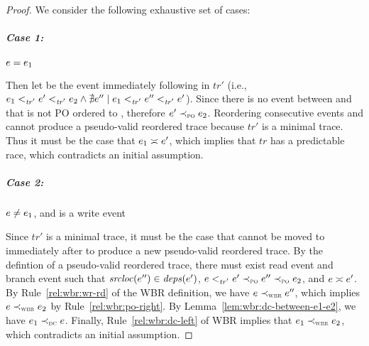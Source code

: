 \documentclass[letter,10pt]{article}
\newcommand{\conflicts}[2]{\ensuremath{#1 \asymp #2}} %
\newcommand{\getStatic}[1]{\ensuremath{\mathit{srcloc}(#1)}\xspace}
\newcommand{\getDeps}[1]{\ensuremath{\mathit{deps}(#1)}\xspace}
\newcommand{\tr}{\ensuremath{\mathit{tr}}\xspace}
\newcommand{\trPrime}{\ensuremath{\mathit{tr'}}\xspace}
\newcommand{\PO}{PO\xspace}
\newcommand{\WDC}{DC\xspace}
\newcommand{\BR}{BR\xspace}
\newcommand{\WBR}{W\BR}
\newcommand{\DCOrdered}[2]{\WDCOrdered{#1}{#2}}
\newcommand{\ltTRPrime}{\ensuremath{<_\textsc{\trPrime}}\xspace}
\newcommand{\ltPO}{\ensuremath{\prec_\textsc{\tiny{\PO}}}\xspace}
\newcommand{\ltWDC}{\ensuremath{\prec_\textsc{\tiny{\WDC}}}\xspace}
\newcommand{\ltWBR}{\ensuremath{\prec_\textsc{\tiny{\WBR}}}\xspace}
\newcommand{\Ordered}[3]{\ensuremath{#1 #2 #3}}
\newcommand{\TRPrimeOrdered}[2]{\Ordered{#1}{\ltTRPrime}{#2}}
\newcommand{\POOrdered}[2]{\Ordered{#1}{\ltPO}{#2}}
\newcommand{\WDCOrdered}[2]{\Ordered{#1}{\ltWDC}{#2}}
\newcommand{\WBROrdered}[2]{\Ordered{#1}{\ltWBR}{#2}}
\newcommand\BrDepsOn[2]{\ensuremath{\getStatic{#2} \in \getDeps{#1}}}
\newcommand{\originalgrumbler}[2]{\begin{quote}\textcolor{blue}{\sl{\bf #1 says:} #2}\end{quote}}
\newcommand{\grumbler}[2]{\originalgrumbler{#1}{#2}}
\newcommand{\mike}[1]{\grumbler{Mike}{#1}}
\newcommand{\kaan}[1]{\grumbler{Kaan}{#1}}
\begin{document}
\begin{proof}
We consider the following exhaustive set of cases:

\subparagraph{Case 1:}
$\event{e} = \event{e}{_1}$

Then let  be the event immediately following  in \trPrime
(i.e., $\TRPrimeOrdered{\event{e}{_1}}{\TRPrimeOrdered{\event{e}{'}}\event{e}{_2}} \land
\nexists \event{e}{''} \mid \TRPrimeOrdered{\event{e}{_1}}{\TRPrimeOrdered{\event{e}{''}}{\event{e}{'}}}$).
Since there is no event between  and  that is not \PO ordered to ,
therefore \POOrdered{\event{e}{'}}{\event{e}{_2}}.
Reordering consecutive events  and  cannot
produce a pseudo-valid reordered trace because \trPrime is a minimal trace.
Thus it must be the case that \conflicts{\event{e}{_1}}{\event{e}{'}},
which implies that \tr has a predictable race, which contradicts an initial assumption.

\subparagraph{Case 2:}
$\event{e} \ne \event{e}{_1}$, and  is a write event

Since \trPrime is a minimal trace,
it must be the case that  cannot be moved to immediately after 
to produce a new pseudo-valid reordered trace.
By the defintion of a pseudo-valid reordered trace,
there must exist read event  and branch event  such that
\BrDepsOn{\event{e}{'}}{\event{e}{''}},
\TRPrimeOrdered{\event{e}}{\POOrdered{\event{e}{'}}{\POOrdered{\event{e}{''}}{\event{e}{_2}}}},
and \conflicts{\event{e}}{\event{e}{'}}.
By Rule~\ref{rel:wbr:wr-rd} of the \WBR definition,
we have \WBROrdered{\event{e}}{\event{e}{''}},
which implies \WBROrdered{\event{e}}{\event{e}{_2}}
by Rule~\ref{rel:wbr:po-right}.
By Lemma~\ref{lem:wbr:dc-between-e1-e2}, we have
\DCOrdered{\event{e}{_1}}{\event{e}}.
Finally, Rule~\ref{rel:wbr:dc-left} of \WBR
implies that \WBROrdered{\event{e}{_1}}{\event{e}{_2}},
which contradicts an initial assumption.



\end{proof}
\end{document}
